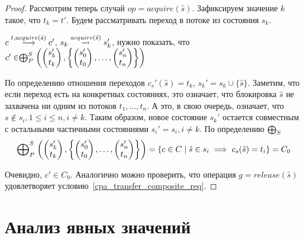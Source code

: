 \begin{proof}
Рассмотрим теперь случай $op = acquire(\hat s)$. Зафиксируем значение $k$ такое, что $t_k = t'$. Будем рассматривать переход в потоке из состояния $s_k$.

$c \stackrel{t, acquire(\hat s)}{\longrightarrow} c'$, $s_k \stackrel{acquire(\hat s)}{\leadsto} s_k'$, нужно показать, что 
$c' \in \mathrel{\bigoplus}^S_P
\left(
\begin{pmatrix}
s_k' \\
t_k 
\end{pmatrix},
\left\{
\begin{pmatrix}
s_0' \\
t_0 
\end{pmatrix},
\dots ,
\begin{pmatrix}
s_n' \\
t_n 
\end{pmatrix}
\right\}
\right)$

По определению отношения переходов $c_s'(\hat s) = t_k$, $s_k' = s_k \cup \{\hat s\}$.
Заметим, что если переход есть на конкретных состояниях, это означает, что блокировка $\hat s$ не захвачена ни одним из потоков $t_1, \dots, t_n$.
А это, в свою очередь, означает, что $s \notin s_i, 1 \le i \le n, i \neq k$.
Таким образом, новое состояние $s_k'$ остается совместным с остальными частичными состояниями $s_i' = s_i, i \neq k$.
По определению $\mathrel{\bigoplus}_S$
\begin{align*}
\mathrel{\bigoplus}^S_P
\left(
\begin{pmatrix}
s_k' \\
t_k 
\end{pmatrix},
\left\{
\begin{pmatrix}
s_0' \\
t_0 
\end{pmatrix},
\dots ,
\begin{pmatrix}
s_n' \\
t_n 
\end{pmatrix}
\right\}
\right) = \{ c \in C \mid \hat s \in s_i \implies c_s(\hat s) = t_i \} = C_0
\end{align*}

Очевидно, $c' \in C_0$.
Аналогично можно проверить, что операция $g = release(\hat s)$ удовлетворяет условию~\ref{cpa_transfer_composite_req}. 

\end{proof}


\section{Анализ явных значений}
\label{sect_value_analysis}

